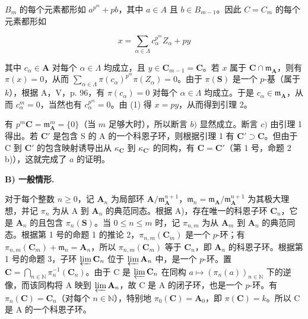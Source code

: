  \(B_{m}\) 的每个元素都形如 \(a^{p^{m}} + pb\)，其中 \(a \in A\) 且 \(b \in B_{m-1}\)。因此 \(C = C_{m}\) 的每个元素都形如

\[
x = \sum_ {\alpha \in \Lambda} c _ {\alpha} ^ {p ^ {m}} Z _ {\alpha} + p y\tag{1}
\]

其中 \(c_{\alpha} \in \mathbf{A}\) 对每个 \(\alpha \in \Lambda\) 均成立，且 \(y \in \mathbf{C}_{m-1} = \mathbf{C}\)。若 \(x\) 属于 \(\mathbf{C} \cap \mathfrak{m}_{\mathbf{A}}\)，则有 \(\pi(x) = 0\)，从而 \(\sum_{\alpha \in \Lambda} \pi(c_{\alpha})^{p^m} \pi(Z_{\alpha}) = 0\)。由于 \(\pi(\mathbf{S})\) 是一个 \(p\)-基（属于 \(k\)），根据 A，V，p. 96，有 \(\pi(c_{\alpha}) = 0\) 对每个 \(\alpha \in \Lambda\) 均成立。于是 \(c_{\alpha} \in \mathfrak{m}_{\mathbf{A}}\)，从而 \(c_{\alpha}^m = 0\)，当然也有 \(c_{\alpha}^{p^m} = 0\)。由 (1) 得 \(x = py\)，从而得到引理 2。

有 \(p^m\mathbf{C} = \mathfrak{m}_{\mathbf{A}}^m = \{0\}\)（当 \(m\) 足够大时），所以断言 \(b)\) 显然成立。断言 \(c)\) 由引理 1 得出。若 \(\mathbf{C}'\) 是包含 S 的 A 的一个科恩子环，则根据引理 1 有 \(\mathbf{C}' \supset \mathbf{C}\)。但由于 C 到 \(\mathbf{C}'\) 的包含映射诱导出从 \(\kappa_{\mathbf{C}}\) 到 \(\kappa_{\mathbf{C}'}\) 的同构，有 \(\mathbf{C} = \mathbf{C}'\)（第 1 号，命题 2 b)），这就完成了 \(a\) 的证明。

\noindent\textbf{B) 一般情形.}\par

对于每个整数 \(n \geqslant 0\)，记 \(\mathbf{A}_n\) 为局部环 \(\mathbf{A}/\mathfrak{m}_{\mathbf{A}}^{n+1}\)，\(\mathfrak{m}_n = \mathfrak{m}_{\mathbf{A}}/\mathfrak{m}_{\mathbf{A}}^{n+1}\) 为其极大理想，并记 \(\pi_n\) 为从 A 到 \(\mathbf{A}_n\) 的典范同态。根据 A)，存在唯一的科恩子环 \(\mathbf{C}_n\)，它是 \(\mathbf{A}_n\) 的且包含 \(\pi_n(\mathbf{S})\)。当 \(0 \leqslant n \leqslant m\) 时，记 \(\pi_{n,m}\) 为从 \(\mathbf{A}_m\) 到 \(\mathbf{A}_n\) 的典范同态。根据第 1 号的命题 1 的推论 2，\(\pi_{n,m}(\mathbf{C}_m)\) 是一个 \(p\)-环；有 \(\pi_{n,m}(\mathbf{C}_m) + \mathfrak{m}_n = \mathbf{A}_n\)，所以 \(\pi_{n,m}(\mathbf{C}_m)\) 等于 \(\mathbf{C}_n\)，即 \(\mathbf{A}_n\) 的科恩子环。根据第 1 号的命题 3，子环 \(\varprojlim \mathbf{C}_n\) 位于 \(\varprojlim \mathbf{A}_n\) 中，是一个 \(p\)-环。置 \(\mathbf{C} = \bigcap_{n \in \mathbb{N}} \pi_n^{-1}(\mathbf{C}_n)\)。由于 C 是 \(\varprojlim \mathbf{C}_n\) 在同构 \(a \mapsto (\pi_n(a))_{n \in \mathbb{N}}\) 下的逆像，而该同构将 A 映到 \(\varprojlim \mathbf{A}_n\)，故 C 是 A 的闭子环，也是一个 \(p\)-环。有 \(\pi_n(\mathbf{C}) = \mathbf{C}_n\)（对每个 \(n \in \mathbb{N}\)），特别地 \(\pi_0(\mathbf{C}) = \mathbf{A}_0\)，即 \(\pi(\mathbf{C}) = k\)。所以 C 是 A 的一个科恩子环。

